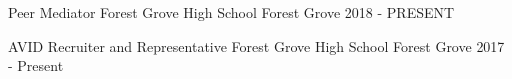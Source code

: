 

\begin{cventries}

  \cventry
    {Peer Mediator} %
    {Forest Grove High School} %
    {Forest Grove} %
    {2018 - PRESENT} %
    {
    }

  \cventry
    {AVID Recruiter and Representative} %
    {Forest Grove High School} %
    {Forest Grove} %
    {2017 - Present} %
    {
    }


\end{cventries}
